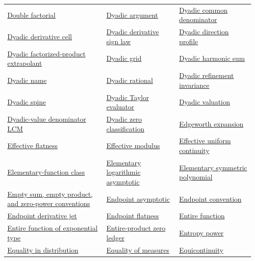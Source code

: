 \documentclass[11pt,oneside]{article}
\begin{document}
\begin{longtable}{L{0.31\textwidth}L{0.31\textwidth}L{0.31\textwidth}}
\hyperlink{gls:double-factorial}{Double factorial} & \hyperlink{gls:dyadic-argument}{Dyadic argument} & \hyperlink{gls:dyadic-common-denominator}{Dyadic common denominator} \\
\hyperlink{gls:dyadic-derivative-cell}{Dyadic derivative cell} & \hyperlink{gls:dyadic-derivative-sign-law}{Dyadic derivative sign law} & \hyperlink{gls:direction-profile}{Dyadic direction profile} \\
\hyperlink{gls:dyadic-factorized-product-extrapolant}{Dyadic factorized-product extrapolant} & \hyperlink{gls:dyadic-grid}{Dyadic grid} & \hyperlink{gls:dyadic-harmonic-sum}{Dyadic harmonic sum} \\
\hyperlink{gls:dyadic-name}{Dyadic name} & \hyperlink{gls:dyadic-rational}{Dyadic rational} & \hyperlink{gls:dyadic-refinement-invariance}{Dyadic refinement invariance} \\
\hyperlink{gls:dyadic-spine}{Dyadic spine} & \hyperlink{gls:dyadic-taylor-evaluator}{Dyadic Taylor evaluator} & \hyperlink{gls:dyadic-valuation}{Dyadic valuation} \\
\hyperlink{gls:dyadic-denominator-lcm}{Dyadic-value denominator LCM} & \hyperlink{gls:dyadic-zero-classification}{Dyadic zero classification} & \hyperlink{gls:edgeworth-expansion}{Edgeworth expansion} \\
\hyperlink{gls:effective-flatness}{Effective flatness} & \hyperlink{gls:effective-modulus}{Effective modulus} & \hyperlink{gls:effective-uniform-continuity}{Effective uniform continuity} \\
\hyperlink{gls:elementary-function-class}{Elementary-function class} & \hyperlink{gls:elementary-logarithmic-asymptotic}{Elementary logarithmic asymptotic} & \hyperlink{gls:elementary-symmetric-polynomial}{Elementary symmetric polynomial} \\
\hyperlink{gls:empty-sum-product-conventions}{Empty sum, empty product, and zero-power conventions} & \hyperlink{gls:endpoint-asymptotic}{Endpoint asymptotic} & \hyperlink{gls:endpoint-convention}{Endpoint convention} \\
\hyperlink{gls:endpoint-derivative-jet}{Endpoint derivative jet} & \hyperlink{gls:endpoint-flatness}{Endpoint flatness} & \hyperlink{gls:entire-function}{Entire function} \\
\hyperlink{gls:entire-function-exponential-type}{Entire function of exponential type} & \hyperlink{gls:entire-product-zero-ledger}{Entire-product zero ledger} & \hyperlink{gls:entropy-power}{Entropy power} \\
\hyperlink{gls:equality-in-distribution}{Equality in distribution} & \hyperlink{gls:equality-of-measures}{Equality of measures} & \hyperlink{gls:equicontinuity}{Equicontinuity} \\

\end{longtable}
\end{document}
